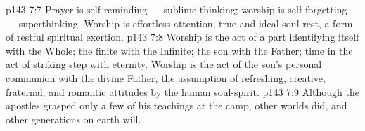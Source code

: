 \vs p143 7:7 \pc Prayer is self\hyp{}reminding --- sublime thinking; worship is self\hyp{}forgetting --- superthinking. Worship is effortless attention, true and ideal soul rest, a form of restful spiritual exertion.
\vs p143 7:8 \pc Worship is the act of a part identifying itself with the Whole; the finite with the Infinite; the son with the Father; time in the act of striking step with eternity. Worship is the act of the son’s personal communion with the divine Father, the assumption of refreshing, creative, fraternal, and romantic attitudes by the human soul\hyp{}spirit.
\vs p143 7:9 \pc Although the apostles grasped only a few of his teachings at the camp, other worlds did, and other generations on earth will.
\quizlink
